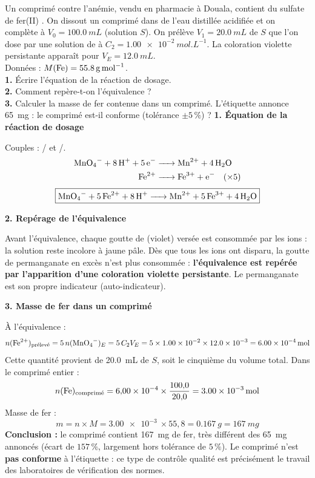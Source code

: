 \documentclass[11pt]{article}
\begin{document}
\begin{exoresolu}
Un comprimé contre l'anémie, vendu en pharmacie à Douala, contient du sulfate de fer(II) . On dissout un comprimé dans de l'eau distillée acidifiée et on complète à $V_0 = \SI{100,0}{mL}$ (solution $S$). On prélève $V_1 = \SI{20,0}{mL}$ de $S$ que l'on dose par une solution de  à $C_2 = \SI{1,00e-2}{mol.L^{-1}}$. La coloration violette persistante apparaît pour $V_E = \SI{12,0}{mL}$.\\
Données : $M(\ce{Fe}) = \SI{55,8}{g.mol^{-1}}$.\\
\textbf{1.} Écrire l'équation de la réaction de dosage.\\
\textbf{2.} Comment repère-t-on l'équivalence ?\\
\textbf{3.} Calculer la masse de fer contenue dans un comprimé. L'étiquette annonce \SI{65}{mg} : le comprimé est-il conforme (tolérance $\pm 5\,\%$) ?
\tcblower
\textbf{1. Équation de la réaction de dosage}

Couples : / et /.
\begin{align*}
\ce{MnO4- + 8H+ + 5e-} &\ce{-> Mn^2+ + 4H2O}\\
\ce{Fe^2+} &\ce{-> Fe^3+ + e-} \quad (\times 5)
\end{align*}
\[ \boxed{\ce{MnO4- + 5Fe^2+ + 8H+ -> Mn^2+ + 5Fe^3+ + 4H2O}} \]

\textbf{2. Repérage de l'équivalence}

Avant l'équivalence, chaque goutte de  (violet) versée est consommée par les ions  : la solution reste incolore à jaune pâle. Dès que tous les ions  ont disparu, la goutte de permanganate en excès n'est plus consommée : \textbf{l'équivalence est repérée par l'apparition d'une coloration violette persistante}. Le permanganate est son propre indicateur (auto-indicateur).

\textbf{3. Masse de fer dans un comprimé}

À l'équivalence :
\[ n(\ce{Fe^2+})_{\text{prélevé}} = 5\,n(\ce{MnO4-})_E = 5\,C_2 V_E = 5 \times \SI{1,00e-2}{} \times \SI{12,0e-3}{} = \SI{6,00e-4}{mol} \]
Cette quantité provient de \SI{20,0}{mL} de $S$, soit le cinquième du volume total. Dans le comprimé entier :
\[ n(\ce{Fe})_{\text{comprimé}} = 6{,}00\times 10^{-4} \times \frac{100{,}0}{20{,}0} = \SI{3,00e-3}{mol} \]
Masse de fer :
\[ m = n \times M = \SI{3,00e-3}{} \times 55{,}8 = \SI{0,167}{g} = \SI{167}{mg} \]
\textbf{Conclusion :} le comprimé contient \SI{167}{mg} de fer, très différent des \SI{65}{mg} annoncés (écart de $157\,\%$, largement hors tolérance de $5\,\%$). Le comprimé n'est \textbf{pas conforme} à l'étiquette : ce type de contrôle qualité est précisément le travail des laboratoires de vérification des normes.
\end{exoresolu}
\end{document}
